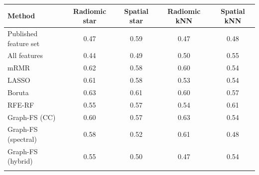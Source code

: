 \begin{tabular}{@{}lcccc@{}}
\toprule
Method & Radiomic star & Spatial star & Radiomic kNN & Spatial kNN \\
\midrule
Published feature set & 0.47 & 0.59 & 0.47 & 0.48 \\
All features & 0.44 & 0.49 & 0.50 & 0.55 \\
mRMR & 0.62 & 0.58 & 0.60 & 0.54 \\
LASSO & 0.61 & 0.58 & 0.53 & 0.54 \\
Boruta & 0.63 & 0.61 & 0.60 & 0.57 \\
RFE-RF & 0.55 & 0.57 & 0.54 & 0.61 \\
Graph-FS (CC) & 0.60 & 0.57 & 0.63 & 0.54 \\
Graph-FS (spectral) & 0.58 & 0.52 & 0.61 & 0.48 \\
Graph-FS (hybrid) & 0.55 & 0.50 & 0.47 & 0.54 \\
\botrule
\end{tabular}
